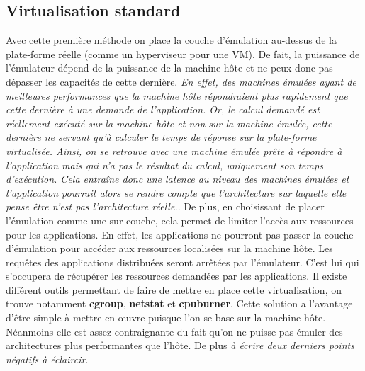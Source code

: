 \subsection{Virtualisation standard}
Avec cette première méthode on place la couche d'émulation au-dessus de la
plate-forme réelle (comme un hyperviseur pour une VM). De fait, la puissance de
l'émulateur dépend de la puissance de la machine hôte et ne peux donc pas
dépasser les capacités de cette dernière. \textit{En effet, des machines émulées
  ayant de meilleures performances que la machine hôte répondraient plus
  rapidement que cette dernière à une demande de l'application. Or, le calcul
  demandé est réellement exécuté sur la machine hôte et non sur la machine
  émulée, cette dernière ne servant qu'à calculer le temps de réponse sur la
  plate-forme virtualisée. Ainsi, on se retrouve avec une machine émulée prête à
  répondre à l'application mais qui n'a pas le résultat du calcul, uniquement
  son temps d'exécution. Cela entraîne donc une latence au niveau des machines
  émulées et l'application pourrait alors se rendre compte que l'architecture
  sur laquelle elle pense être n'est pas l'architecture réelle.}. De plus, en
choisissant de placer l'émulation comme une sur-couche, cela permet de limiter
l'accès aux ressources pour les applications. En effet, les applications ne
pourront pas passer la couche d'émulation pour accéder aux ressources localisées
sur la machine hôte. Les requêtes des applications distribuées seront arrêtées
par l'émulateur. C'est lui qui s'occupera de récupérer les ressources demandées
par les applications. Il existe différent outils permettant de faire de mettre
en place cette virtualisation, on trouve notamment \textbf{cgroup},
\textbf{netstat} et \textbf{cpuburner}.  Cette solution a l'avantage d'être
simple à mettre en \oe uvre puisque l'on se base sur la machine hôte. Néanmoins
elle est assez contraignante du fait qu'on ne puisse pas émuler des
architectures plus performantes que l'hôte. De plus {\color{red} \textit{à
    écrire deux derniers points négatifs à éclaircir}}.

